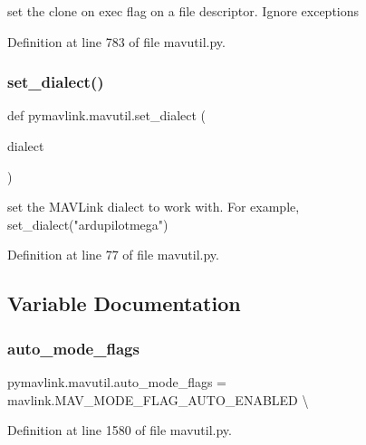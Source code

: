 \begin{DoxyVerb}set the clone on exec flag on a file descriptor. Ignore exceptions\end{DoxyVerb}
 

Definition at line 783 of file mavutil.\+py.

\mbox{\label{namespacepymavlink_1_1mavutil_a00783411dfe2e390ef6fe4427a7a1b76}} 
\subsubsection{\texorpdfstring{set\_dialect()}{set\_dialect()}}
{\footnotesize\ttfamily def pymavlink.\+mavutil.\+set\+\_\+dialect (\begin{DoxyParamCaption}\item[{}]{dialect }\end{DoxyParamCaption})}

\begin{DoxyVerb}set the MAVLink dialect to work with.
For example, set_dialect("ardupilotmega")
\end{DoxyVerb}
 

Definition at line 77 of file mavutil.\+py.



\subsection{Variable Documentation}
\mbox{\label{namespacepymavlink_1_1mavutil_abff145f84bef16fa8ccf3ec9c194e72f}} 
\subsubsection{\texorpdfstring{auto\_mode\_flags}{auto\_mode\_flags}}
{\footnotesize\ttfamily pymavlink.\+mavutil.\+auto\+\_\+mode\+\_\+flags = mavlink.\+M\+A\+V\+\_\+\+M\+O\+D\+E\+\_\+\+F\+L\+A\+G\+\_\+\+A\+U\+T\+O\+\_\+\+E\+N\+A\+B\+L\+ED \textbackslash{}}



Definition at line 1580 of file mavutil.\+py.

